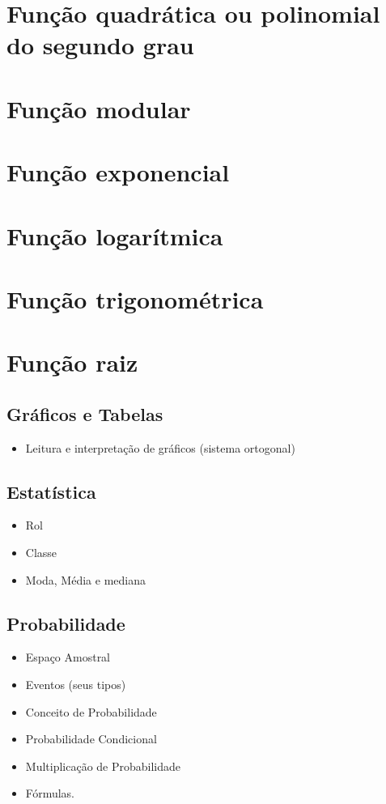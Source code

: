 \documentclass[11pt,fleqn]{book}
\begin{document}
\chapter{Função quadrática ou polinomial do segundo grau}

\chapter{Função modular}

\chapter{Função exponencial}

\chapter{Função logarítmica}

\chapter{Função trigonométrica}

\chapter{Função raiz}


\section{Gráficos e Tabelas}%
\begin{itemize}
	\item Leitura e interpretação de gráficos (sistema ortogonal)
\end{itemize}

\section{Estatística}%
	\begin{itemize}
		\item Rol
		\item Classe
		\item Moda, Média e mediana 
	\end{itemize}

\section{Probabilidade}%

	\begin{itemize}
		\item Espaço Amostral
		\item Eventos (seus tipos)
		\item Conceito de Probabilidade
		\item Probabilidade Condicional
		\item Multiplicação de Probabilidade
		\item Fórmulas.
	\end{itemize}
\end{document}

